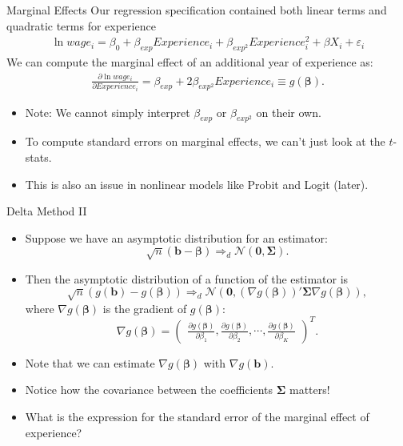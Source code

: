 \begin{frame}{Marginal Effects}
Our regression specification contained both linear terms and quadratic terms for experience
\begin{align*}
\ln wage_i = \beta_0 + \beta_{exp} Experience_i + \beta_{exp^2} Experience^2_i + \beta X_i + \varepsilon_i
\end{align*}
We can compute the marginal effect of an additional year of experience as:
\begin{align*}
\frac{\partial \ln wage_i}{\partial Experience_i} = \beta_{exp} + 2 \beta_{exp^2} Experience_i \equiv g(\boldsymbol{\beta}).
\end{align*}
\begin{itemize}
\item Note: We cannot simply interpret $\beta_{exp}$ or $\beta_{exp^2}$ on their own.
\item To compute standard errors on marginal effects, we can't just look at the $t$-stats.
\item This is also an issue in \alert{nonlinear models} like Probit and Logit (later).
\end{itemize}
\end{frame}


\begin{frame}{Delta Method II}
	\small
\begin{itemize}
\item Suppose we have an asymptotic distribution for an estimator: 
\[
\sqrt{n}\left(\boldsymbol{b}-\boldsymbol{\beta}\right)\Rightarrow_{d}\mathcal{N}\left(\boldsymbol{0},\boldsymbol{\Sigma}\right).
\]
\item Then the asymptotic distribution of a function of the estimator is
\[
\sqrt{n}\left(g\left(\boldsymbol{b}\right)-g\left(\boldsymbol{\beta}\right)\right)\Rightarrow_{d}\mathcal{N}\left(\boldsymbol{0},\left(\nabla g\left(\boldsymbol{\beta}\right)\right)'\boldsymbol{\Sigma}\nabla g\left(\boldsymbol{\beta}\right)\right),
\]
where $\nabla g\left(\boldsymbol{\beta}\right)$ is the gradient of
$g\left(\boldsymbol{\beta}\right)$: 
\[
\nabla g\left(\boldsymbol{\beta}\right)=\left(\begin{array}{c}
\frac{\partial g\left(\boldsymbol{\beta}\right)}{\partial\beta_{1}},
\frac{\partial g\left(\boldsymbol{\beta}\right)}{\partial\beta_{2}},
\cdots,
\frac{\partial g\left(\boldsymbol{\beta}\right)}{\partial\beta_{K}}
\end{array}\right)^T.
\]
\item Note that we can estimate $\nabla g\left(\boldsymbol{\beta}\right)$
with $\nabla g\left(\boldsymbol{b}\right)$.
\item Notice how the covariance between the coefficients $\boldsymbol{\Sigma}$ matters!
\item What is the expression for the standard error of the marginal effect of experience?
\end{itemize}
\end{frame}



